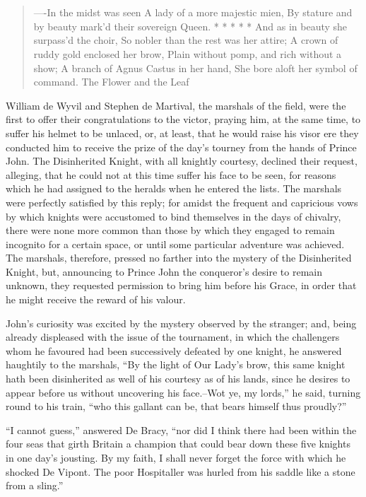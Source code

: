 \chapter{}

\begin{quote}
----In the midst was seen
A lady of a more majestic mien,
By stature and by beauty mark'd their sovereign Queen.
* * * * *
And as in beauty she surpass'd the choir,
So nobler than the rest was her attire;
A crown of ruddy gold enclosed her brow,
Plain without pomp, and rich without a show;
A branch of Agnus Castus in her hand,
She bore aloft her symbol of command.
The Flower and the Leaf
\end{quote}

William de Wyvil and Stephen de Martival, the marshals of the field,
were the first to offer their congratulations to the victor, praying
him, at the same time, to suffer his helmet to be unlaced, or, at least,
that he would raise his visor ere they conducted him to receive the
prize of the day's tourney from the hands of Prince John. The
Disinherited Knight, with all knightly courtesy, declined their request,
alleging, that he could not at this time suffer his face to be seen, for
reasons which he had assigned to the heralds when he entered the lists.
The marshals were perfectly satisfied by this reply; for amidst the
frequent and capricious vows by which knights were accustomed to bind
themselves in the days of chivalry, there were none more common than
those by which they engaged to remain incognito for a certain space, or
until some particular adventure was achieved. The marshals, therefore,
pressed no farther into the mystery of the Disinherited Knight, but,
announcing to Prince John the conqueror's desire to remain unknown, they
requested permission to bring him before his Grace, in order that he
might receive the reward of his valour.

John's curiosity was excited by the mystery observed by the stranger;
and, being already displeased with the issue of the tournament, in which
the challengers whom he favoured had been successively defeated by one
knight, he answered haughtily to the marshals, ``By the light of Our
Lady's brow, this same knight hath been disinherited as well of his
courtesy as of his lands, since he desires to appear before us without
uncovering his face.--Wot ye, my lords,'' he said, turning round to his
train, ``who this gallant can be, that bears himself thus proudly?''

``I cannot guess,'' answered De Bracy, ``nor did I think there had been
within the four seas that girth Britain a champion that could bear down
these five knights in one day's jousting. By my faith, I shall never
forget the force with which he shocked De Vipont. The poor Hospitaller
was hurled from his saddle like a stone from a sling.''

